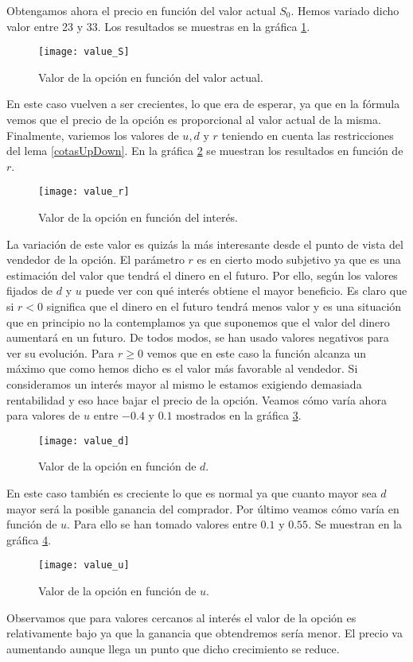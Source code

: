 Obtengamos ahora el precio en función del valor actual $ S_0 $. Hemos variado dicho valor entre 23 y 33. Los resultados se muestras en la gráfica \ref{valueS}. 

\begin{figure}[h!]
	\centering
	\texttt{[image: value\_S]}
	\caption{Valor de la opción en función del valor actual.}
	\label{valueS}
\end{figure}
En este caso vuelven a ser crecientes, lo que era de esperar, ya que en la fórmula vemos que el precio de la opción es proporcional al valor actual de la misma. Finalmente, variemos los valores de  $ u, d \text{ y } r$ teniendo en cuenta las restricciones del lema \ref{cotasUpDown}. En la gráfica \ref{valuer} se muestran los resultados en función de $ r $.
\begin{figure}[h!]
	\centering
	\texttt{[image: value\_r]}
	\caption{Valor de la opción en función del interés.}
	\label{valuer}
\end{figure}
La variación de este valor es quizás la más interesante desde el punto de vista del vendedor de la opción. El parámetro $ r $ es en cierto modo subjetivo ya que es una estimación del valor que tendrá el dinero en el futuro. Por ello, según los valores fijados de $ d $ y $ u $ puede ver con qué interés obtiene el mayor beneficio. Es claro que si $ r < 0 $ significa que el dinero en el futuro tendrá menos valor y es una situación que en principio no la contemplamos ya que suponemos que el valor del dinero aumentará en un futuro. De todos modos, se han usado valores negativos para ver su evolución. Para $ r \geq 0 $ vemos que en este caso la función alcanza un máximo que como hemos dicho es el valor más favorable al vendedor. Si consideramos un interés mayor al mismo le estamos exigiendo demasiada rentabilidad y eso hace bajar el precio de la opción. Veamos cómo varía ahora para valores de $ u $ entre $ -0.4 $ y $ 0.1 $ mostrados en la gráfica \ref{valued}.
\begin{figure}[h!]
	\centering
	\texttt{[image: value\_d]}
	\caption{Valor de la opción en función de $ d $.}
	\label{valued}
\end{figure}
En este caso también es creciente lo que es normal ya que cuanto mayor sea $ d $ mayor será la posible ganancia del comprador. Por último veamos cómo varía en función de $ u $. Para ello se han tomado valores entre $ 0.1 $ y $ 0.55 $. Se muestran en la gráfica \ref{valueu}.
\begin{figure}[h!]
	\centering
	\texttt{[image: value\_u]}
	\caption{Valor de la opción en función de $ u $.}
	\label{valueu}
\end{figure}

Observamos que para valores cercanos al interés el valor de la opción es relativamente bajo ya que la ganancia que obtendremos sería menor. El precio va aumentando aunque llega un punto que dicho crecimiento se reduce.